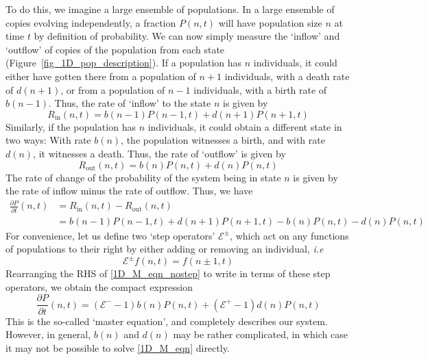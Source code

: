 To do this, we imagine a large ensemble of populations. In a large ensemble of copies evolving independently, a fraction $P(n,t)$ will have population size $n$ at time $t$ by definition of probability. We can now simply measure the `inflow' and `outflow' of copies of the population from each state (Figure~\ref{fig_1D_pop_description}). If a population has $n$ individuals, it could either have gotten there from a population of $n+1$ individuals, with a death rate of $d(n+1)$, or from a population of $n-1$ individuals, with a birth rate of $b(n-1)$. Thus, the rate of `inflow' to the state $n$ is given by
\begin{equation}
	\label{1D_rate_in}
	R_{\textrm{in}}(n,t) = b(n-1)P(n-1,t) + d(n+1)P(n+1,t)
\end{equation}
Similarly, if the population has $n$ individuals, it could obtain a different state in two ways: With rate $b(n)$, the population witnesses a birth, and with rate $d(n)$, it witnesses a death. Thus, the rate of `outflow' is given by
\begin{equation}
	\label{1D_rate_out}
	R_{\textrm{out}}(n,t) = b(n)P(n,t) + d(n)P(n,t)
\end{equation}
The rate of change of the probability of the system being in state $n$ is given by the rate of inflow minus the rate of outflow. Thus, we have
\begin{align}
	\frac{\partial P}{\partial t}(n,t) &= R_{\textrm{in}}(n,t) - R_{\textrm{out}}(n,t)\nonumber\\
	&= b(n-1)P(n-1,t) + d(n+1)P(n+1,t) - b(n)P(n,t) - d(n)P(n,t)\label{1D_M_eqn_nostep}
\end{align}
For convenience, let us define two `step operators' $\mathcal{E}^{\pm}$, which act on any functions of populations to their right by either adding or removing an individual, \textit{i.e}
\begin{equation*}
	\mathcal{E}^{\pm}f(n,t) = f(n \pm 1,t)
\end{equation*}
Rearranging the RHS of \eqref{1D_M_eqn_nostep} to write in terms of these step operators, we obtain the compact expression
\begin{equation}
	\label{1D_M_eqn}
	\frac{\partial P}{\partial t}(n,t) = (\mathcal{E}^{-}-1)b(n)P(n,t) + (\mathcal{E}^{+}-1)d(n)P(n,t)
\end{equation}
This is the so-called `master equation', and completely describes our system. However, in general, $b(n)$ and $d(n)$ may be rather complicated, in which case it may not be possible to solve \eqref{1D_M_eqn} directly.

